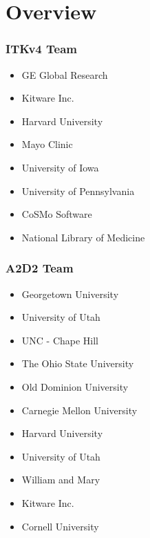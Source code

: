 \section{Overview}







{
\begin{frame}
\frametitle{ITKv4 Team}
\large
\begin{itemize}
\item GE Global Research
\pause
\item Kitware Inc.
\pause
\item Harvard University
\pause
\item Mayo Clinic
\pause
\item University of Iowa
\pause
\item University of Pennsylvania
\pause
\item CoSMo Software
\pause
\item National Library of Medicine
\end{itemize}
\end{frame}
}

{
\begin{frame}
\frametitle{A2D2 Team}
\large
\begin{itemize}
\item Georgetown University
\pause
\item University of Utah
\pause
\item UNC - Chape Hill
\pause
\item The Ohio State University
\pause
\item Old Dominion University
\pause
\item Carnegie Mellon University
\pause
\item Harvard University
\pause
\item University of Utah
\pause
\item William and Mary
\pause
\item Kitware Inc.
\pause
\item Cornell University
\end{itemize}
\end{frame}
}

